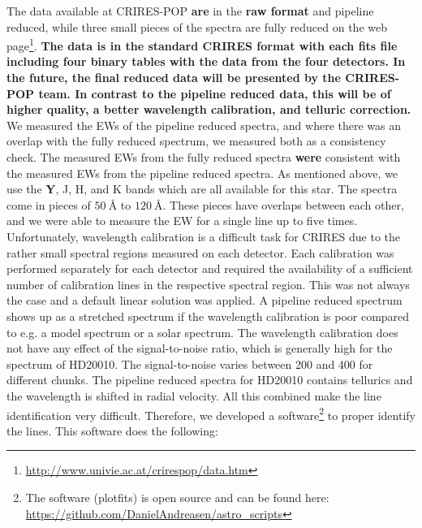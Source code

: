 \documentclass{aa}
\begin{document}
The data available at CRIRES-POP \textbf{are} in the \textbf{raw format} and pipeline
reduced, while three small pieces of the spectra are fully reduced on the web
page\footnote{\url{http://www.univie.ac.at/crirespop/data.htm}}. \textbf{The data
is in the standard CRIRES format with each fits file including four
binary tables with the data from the four detectors. In the future, the final
reduced data will be presented by the CRIRES-POP team. In contrast to the pipeline reduced data, this
will be of higher quality, a better wavelength calibration, and telluric correction.} We
measured the EWs of the pipeline reduced spectra, and where there was
an overlap with the fully reduced spectrum, we measured both as a
consistency check. The measured EWs from the fully reduced spectra \textbf{were}
consistent with the measured EWs from the pipeline reduced spectra. As
mentioned above, we use the \textbf{Y}, J, H, and K bands which are all available
for this star. The spectra come in pieces of $\SI{50}{\angstrom}$
to $\SI{120}{\angstrom}$. These pieces have overlaps between each
other, and we were able to measure the EW for a single line up to
five times. Unfortunately, wavelength calibration is a difficult task
for CRIRES due to the rather small spectral regions measured on each
detector. Each calibration was performed separately for each detector
and required the availability of a sufficient number of calibration
lines in the respective spectral region. This was not always the case
and a default linear solution was applied. A pipeline reduced spectrum
shows up as a stretched spectrum if the wavelength calibration is poor
compared to e.g. a model spectrum or a solar spectrum. The wavelength
calibration does not have any effect of the signal-to-noise ratio, which
is generally high for the spectrum of HD20010. The signal-to-noise
varies between 200 and 400 for different chunks. The pipeline reduced
spectra for HD20010 contains tellurics and the wavelength is shifted in
radial velocity. All this combined make the line identification very
difficult. Therefore, we developed a software\footnote{The software
(plot\textunderscore{}fits) is open source and can be found here:
\url{https://github.com/DanielAndreasen/astro_scripts}} to proper
identify the lines. This software does the following:
\end{document}
